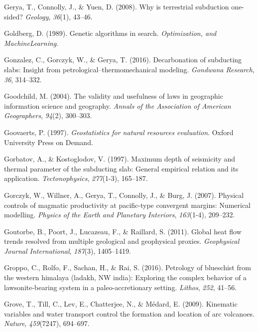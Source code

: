 \begin{CSLReferences}{1}{1}
\leavevmode{}%
Gerya, T., Connolly, J., \& Yuen, D. (2008). Why is terrestrial subduction one-sided? \emph{Geology}, \emph{36}(1), 43--46.

\leavevmode{}%
Goldberg, D. (1989). Genetic algorithms in search. \emph{Optimization, and MachineLearning}.

\leavevmode{}%
Gonzalez, C., Gorczyk, W., \& Gerya, T. (2016). Decarbonation of subducting slabs: Insight from petrological--thermomechanical modeling. \emph{Gondwana Research}, \emph{36}, 314--332.

\leavevmode{}%
Goodchild, M. (2004). The validity and usefulness of laws in geographic information science and geography. \emph{Annals of the Association of American Geographers}, \emph{94}(2), 300--303.

\leavevmode{}%
Goovaerts, P. (1997). \emph{Geostatistics for natural resources evaluation}. Oxford University Press on Demand.

\leavevmode{}%
Gorbatov, A., \& Kostoglodov, V. (1997). Maximum depth of seismicity and thermal parameter of the subducting slab: General empirical relation and its application. \emph{Tectonophysics}, \emph{277}(1-3), 165--187.

\leavevmode{}%
Gorczyk, W., Willner, A., Gerya, T., Connolly, J., \& Burg, J. (2007). Physical controls of magmatic productivity at pacific-type convergent margins: Numerical modelling. \emph{Physics of the Earth and Planetary Interiors}, \emph{163}(1-4), 209--232.

\leavevmode{}%
Goutorbe, B., Poort, J., Lucazeau, F., \& Raillard, S. (2011). Global heat flow trends resolved from multiple geological and geophysical proxies. \emph{Geophysical Journal International}, \emph{187}(3), 1405--1419.

\leavevmode{}%
Groppo, C., Rolfo, F., Sachan, H., \& Rai, S. (2016). Petrology of blueschist from the western himalaya (ladakh, NW india): Exploring the complex behavior of a lawsonite-bearing system in a paleo-accretionary setting. \emph{Lithos}, \emph{252}, 41--56.

\leavevmode{}%
Grove, T., Till, C., Lev, E., Chatterjee, N., \& Médard, E. (2009). Kinematic variables and water transport control the formation and location of arc volcanoes. \emph{Nature}, \emph{459}(7247), 694--697.


\end{CSLReferences}
